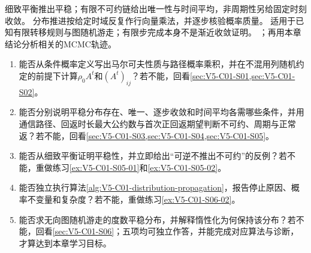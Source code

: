 \begin{SLCompactClosure}
\label{struct:V5-C01-CH36}
{细致平衡推出平稳；有限不可约链给出唯一性与时间平均，非周期性另给固定时刻收敛。}
{分布推进按给定时域反复作行向量乘法，并逐步核验概率质量。}
{适用于已知有限转移规则与图随机游走；有限步完成本身不是渐近收敛证明。}
{；再用本章结论分析相关的MCMC轨迹。}

\label{struct:V5-C01-CH37}
\begin{selfcheckbox}
\begin{enumerate}[leftmargin=2.2em]
  \item 能否从条件概率定义写出马尔可夫性质与路径概率乘积，并在不混用列随机约定的前提下计算$\rho_0A^t$和$(A^t)_{ij}$？若不能，回看\cref{sec:V5-C01-S01,sec:V5-C01-S02}。
  \item 能否分别说明平稳分布存在、唯一、逐步收敛和时间平均各需哪些条件，并用通信路径、回返时长最大公约数与首次正回返期望判断不可约、周期与正常返？若不能，回看\cref{sec:V5-C01-S03,sec:V5-C01-S04,sec:V5-C01-S05}。
  \item 能否从细致平衡证明平稳性，并立即给出“可逆不推出不可约”的反例？若不能，重做练习\ref{ex:V5-C01-S05-01}和\ref{ex:V5-C01-S05-02}。
  \item 能否独立执行算法\ref{alg:V5-C01-distribution-propagation}，报告停止原因、概率不变量和复杂度？若不能，重做练习\ref{ex:V5-C01-S06-02}。
  \item 能否求无向图随机游走的度数平稳分布，并解释惰性化为何保持该分布？若不能，回看\cref{sec:V5-C01-S06}；五项均可独立作答，并能完成对应算法与诊断，才算达到本章学习目标。
\end{enumerate}
\end{selfcheckbox}
\end{SLCompactClosure}
